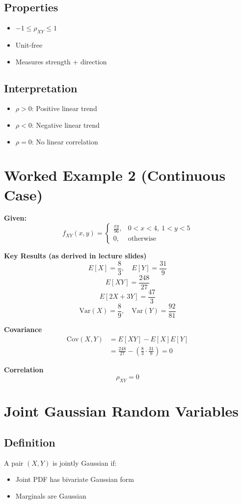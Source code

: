 \documentclass[11pt]{article}
\begin{document}
\subsection{Properties}
\begin{itemize}
    \item $-1 \le \rho_{XY} \le 1$
    \item Unit-free
    \item Measures strength + direction
\end{itemize}

\subsection{Interpretation}
\begin{itemize}
    \item $\rho > 0$: Positive linear trend
    \item $\rho < 0$: Negative linear trend
    \item $\rho = 0$: No linear correlation
\end{itemize}

\section{Worked Example 2 (Continuous Case)}
\textbf{Given:}
\[
f_{XY}(x,y) =
\begin{cases}
\frac{xy}{96}, & 0 < x < 4,\ 1 < y < 5 \\
0, & \text{otherwise}
\end{cases}
\]

\textbf{Key Results (as derived in lecture slides)}
\[ E[X] = \frac{8}{3}, \quad E[Y] = \frac{31}{9} \]
\[ E[XY] = \frac{248}{27} \]
\[ E[2X+3Y] = \frac{47}{3} \]
\[ \text{Var}(X) = \frac{8}{9}, \quad \text{Var}(Y) = \frac{92}{81} \]

\textbf{Covariance}
\begin{align*}
\text{Cov}(X,Y) &= E[XY] - E[X]E[Y] \\
&= \frac{248}{27} - \left(\frac{8}{3} \cdot \frac{31}{9}\right) = 0
\end{align*}

\textbf{Correlation}
\[ \rho_{XY} = 0 \]

\section{Joint Gaussian Random Variables}
\subsection{Definition}
A pair $(X,Y)$ is jointly Gaussian if:
\begin{itemize}
    \item Joint PDF has bivariate Gaussian form
    \item Marginals are Gaussian
\end{itemize}
\end{document}
